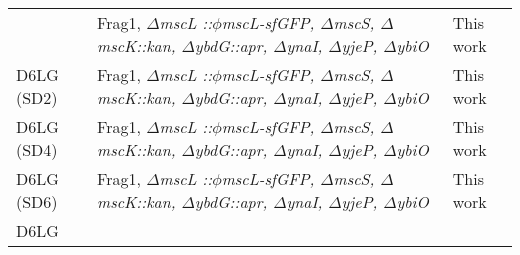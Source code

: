 \begin{longtable}[]{@{}lll@{}}
&
\begin{minipage}[t]{0.63\columnwidth}\raggedright\strut
Frag1,
\emph{\(\Delta\)mscL
::\(\phi\)mscL-sfGFP,
\(\Delta\)mscS,
\(\Delta\)mscK::kan,
\(\Delta\)ybdG::apr,
\(\Delta\)ynaI,
\(\Delta\)yjeP,
\(\Delta\)ybiO}\strut
\end{minipage}
&
\begin{minipage}[t]{0.13\columnwidth}\raggedright\strut
This
work\strut
\end{minipage}\tabularnewline
\begin{minipage}[t]{0.16\columnwidth}\raggedright\strut
D6LG
(SD2)\strut
\end{minipage}
&
\begin{minipage}[t]{0.63\columnwidth}\raggedright\strut
Frag1,
\emph{\(\Delta\)mscL
::\(\phi\)mscL-sfGFP,
\(\Delta\)mscS,
\(\Delta\)mscK::kan,
\(\Delta\)ybdG::apr,
\(\Delta\)ynaI,
\(\Delta\)yjeP,
\(\Delta\)ybiO}\strut
\end{minipage}
&
\begin{minipage}[t]{0.13\columnwidth}\raggedright\strut
This
work\strut
\end{minipage}\tabularnewline
\begin{minipage}[t]{0.16\columnwidth}\raggedright\strut
D6LG
(SD4)\strut
\end{minipage}
&
\begin{minipage}[t]{0.63\columnwidth}\raggedright\strut
Frag1,
\emph{\(\Delta\)mscL
::\(\phi\)mscL-sfGFP,
\(\Delta\)mscS,
\(\Delta\)mscK::kan,
\(\Delta\)ybdG::apr,
\(\Delta\)ynaI,
\(\Delta\)yjeP,
\(\Delta\)ybiO}\strut
\end{minipage}
&
\begin{minipage}[t]{0.13\columnwidth}\raggedright\strut
This
work\strut
\end{minipage}\tabularnewline
\begin{minipage}[t]{0.16\columnwidth}\raggedright\strut
D6LG
(SD6)\strut
\end{minipage}
&
\begin{minipage}[t]{0.63\columnwidth}\raggedright\strut
Frag1,
\emph{\(\Delta\)mscL
::\(\phi\)mscL-sfGFP,
\(\Delta\)mscS,
\(\Delta\)mscK::kan,
\(\Delta\)ybdG::apr,
\(\Delta\)ynaI,
\(\Delta\)yjeP,
\(\Delta\)ybiO}\strut
\end{minipage}
&
\begin{minipage}[t]{0.13\columnwidth}\raggedright\strut
This
work\strut
\end{minipage}\tabularnewline
\begin{minipage}[t]{0.16\columnwidth}\raggedright\strut
D6LG

\end{minipage}
\end{longtable}

